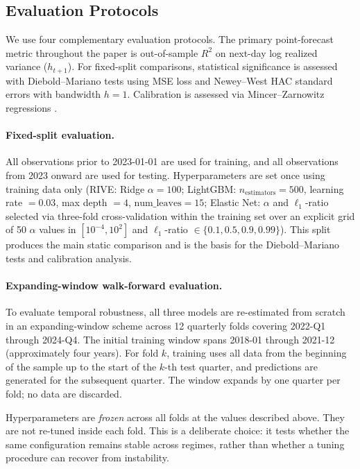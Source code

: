 \documentclass[review]{elsarticle}
\begin{document}
\subsection{Evaluation Protocols}\label{evaluation-protocol}

We use four complementary evaluation protocols. The primary point-forecast metric throughout the paper is out-of-sample $R^2$ on next-day log realized variance ($h_{t+1}$). For fixed-split comparisons, statistical significance is assessed with Diebold--Mariano tests \cite{diebold1995} using MSE loss and Newey--West HAC standard errors \cite{newey1987} with bandwidth $h=1$. Calibration is assessed via Mincer--Zarnowitz regressions \cite{mincer1969}.

\paragraph{Fixed-split evaluation.}
All observations prior to 2023-01-01 are used for training, and all observations from 2023 onward are used for testing. Hyperparameters are set once using training data only (RIVE: Ridge $\alpha=100$; LightGBM: $n_{\text{estimators}}=500$, learning rate $=0.03$, max depth $=4$, $\text{num\_leaves}=15$; Elastic Net: $\alpha$ and $\ell_1$-ratio selected via three-fold cross-validation within the training set over an explicit grid of 50 $\alpha$ values in $[10^{-4},10^{2}]$ and $\ell_1$-ratio $\in \{0.1,0.5,0.9,0.99\}$). This split produces the main static comparison and is the basis for the Diebold--Mariano tests and calibration analysis.

\paragraph{Expanding-window walk-forward evaluation.}
To evaluate temporal robustness, all three models are re-estimated from scratch in an expanding-window scheme across 12 quarterly folds covering 2022-Q1 through 2024-Q4. The initial training window spans 2018-01 through 2021-12 (approximately four years). For fold $k$, training uses all data from the beginning of the sample up to the start of the $k$-th test quarter, and predictions are generated for the subsequent quarter. The window expands by one quarter per fold; no data are discarded.

Hyperparameters are \emph{frozen} across all folds at the values described above. They are not re-tuned inside each fold. This is a deliberate choice: it tests whether the same configuration remains stable across regimes, rather than whether a tuning procedure can recover from instability.
\end{document}
